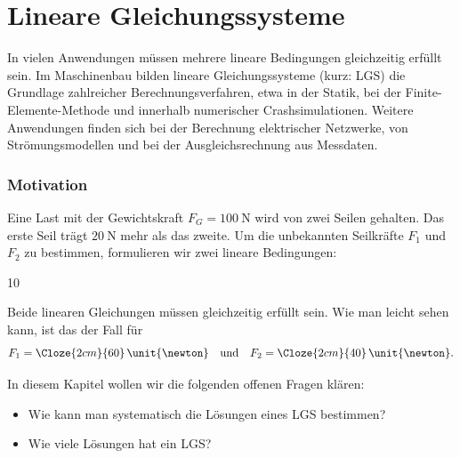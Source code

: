 \chapter{Lineare Gleichungssysteme}
\label{chap:linear_systems}

In vielen Anwendungen müssen mehrere lineare Bedingungen gleichzeitig erfüllt
sein. Im Maschinenbau bilden lineare Gleichungssysteme (kurz: LGS) die
Grundlage zahlreicher Berechnungsverfahren,
etwa in der Statik, bei der Finite-Elemente-Methode und innerhalb numerischer
Crashsimulationen. Weitere Anwendungen finden sich bei der Berechnung elektrischer
Netzwerke, von Strömungsmodellen und bei der Ausgleichsrechnung aus Messdaten.


\subsection*{Motivation}

Eine Last mit der Gewichtskraft $F_G=\qty{100}{\newton}$ wird von zwei Seilen
gehalten. Das erste Seil trägt $\qty{20}{\newton}$ mehr als das zweite. 
Um die unbekannten Seilkräfte $F_1$ und $F_2$ zu bestimmen, formulieren wir zwei
lineare Bedingungen:

\noindent
\begin{minipage}[c]{0.28\linewidth}
  \centering
\end{minipage}%
\hfill
\begin{minipage}[c]{0.69\linewidth}
  \begin{ClozeArea}[24]{10}
    \centering
  \end{ClozeArea}
\end{minipage}

Beide linearen Gleichungen müssen gleichzeitig erfüllt sein. Wie man leicht sehen kann, ist das der Fall für
\[
  F_1=\Cloze{2cm}{60}\,\unit{\newton}
  \quad \text{und} \quad
  F_2=\Cloze{2cm}{40}\,\unit{\newton}.
\]

\par\vspace{1cm}
In diesem Kapitel wollen wir die folgenden offenen Fragen klären:
\begin{itemize}
  \item Wie kann man systematisch die Lösungen eines LGS bestimmen?
  \item Wie viele Lösungen hat ein LGS?
\end{itemize}

\clearpage

\clearpage

\clearpage

\clearpage

